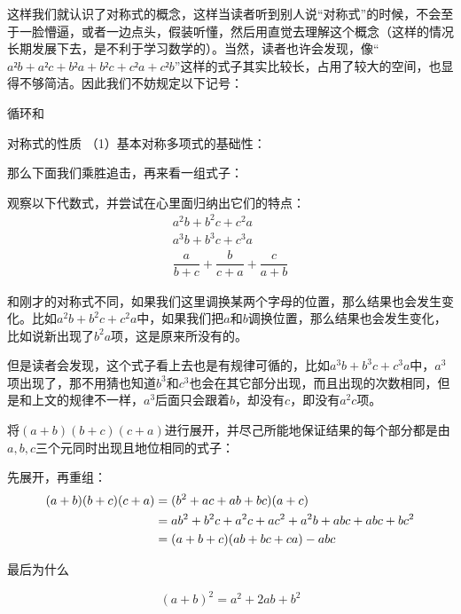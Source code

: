 这样我们就认识了对称式的概念，这样当读者听到别人说“对称式”的时候，不会至于一脸懵逼，或者一边点头，假装听懂，然后用直觉去理解这个概念（这样的情况长期发展下去，是不利于学习数学的）。当然，读者也许会发现，像“$a²b + a²c + b²a + b²c + c²a + c²b$”这样的式子其实比较长，占用了较大的空间，也显得不够简洁。因此我们不妨规定以下记号：
\begin{definition}{循环和}{}

\end{definition}

\begin{property}{对称式的性质}{}
    （1）基本对称多项式的基础性​​：

\end{property}

那么下面我们乘胜追击，再来看一组式子：
\begin{example}{}{}
    观察以下代数式，并尝试在心里面归纳出它们的特点：\vspace{-10pt}
    \begin{gather*}
        a^2b+b^2c+c^2a\\
        a^3b+b^3c+c^3a\\
        \dfrac{a}{b+c}+\dfrac{b}{c+a}+\dfrac{c}{a+b}
    \end{gather*}
\end{example}
\begin{solution}
    和刚才的对称式不同，如果我们这里调换某两个字母的位置，那么结果也会发生变化。比如$a^2b+b^2c+c^2a$中，如果我们把$a$和$b$调换位置，那么结果也会发生变化，比如说新出现了$b^2a$项，这是原来所没有的。

    但是读者会发现，这个式子看上去也是有规律可循的，比如$a^3b+b^3c+c^3a$中，$a^3$项出现了，那不用猜也知道$b^3$和$c^3$也会在其它部分出现，而且出现的次数相同，但是和上文的规律不一样，$a^3$后面只会跟着$b$，却没有$c$，即没有$a^2c$项。
\end{solution}
\begin{example}{}{}
    将$(a+b)(b+c)(c+a)$进行展开，并尽己所能地保证结果的每个部分都是由$a,b,c$三个元同时出现且地位相同的式子：
\end{example}
\begin{solution}
    先展开，再重组：\vspace{-10pt}
    \begin{align*}
    \vspace{-15pt}
    (a+b)(b+c)(c+a)&=(b^2+ac+ab+bc)(a+c)\\
    &=ab^2+b^2c+a^2c+ac^2+a^2b+abc+abc+bc^2\\
    &=(a+b+c)(ab+bc+ca)-abc
    \vspace{-10pt}
    \end{align*}
\end{solution}
最后为什么

\begin{theorem}{}{}
    $$(a+b)^2=a^2+2ab+b^2$$

\end{theorem}